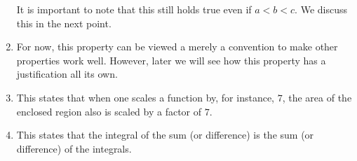 \documentclass{ximera}
\begin{document}
\begin{theorem}
\begin{explanation}
\begin{enumerate}
\begin{image}
  \end{image}		
  It is important to note that this still holds true even if
  $a<b<c$. We discuss this in the next point.
  
\item For now, this property can be viewed a merely a convention to
  make other properties work well. However, later we will see how this
  property has a justification all its own.

\item This states that when one scales a function by, for instance, $7$,
  the area of the enclosed region also is scaled by a factor of
  $7$.
\item This states that the integral of the sum (or difference) is the sum (or difference) of the
  integrals.
\end{enumerate}
\end{explanation}
\end{theorem}
\end{document}
